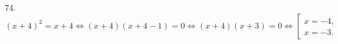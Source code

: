 74. $(x+4)^2=x+4\Leftrightarrow (x+4)(x+4-1)=0\Leftrightarrow(x+4)(x+3)=0\Leftrightarrow\left[\begin{array}{l}x=-4,\\ x=-3.\end{array}\right.$\\
